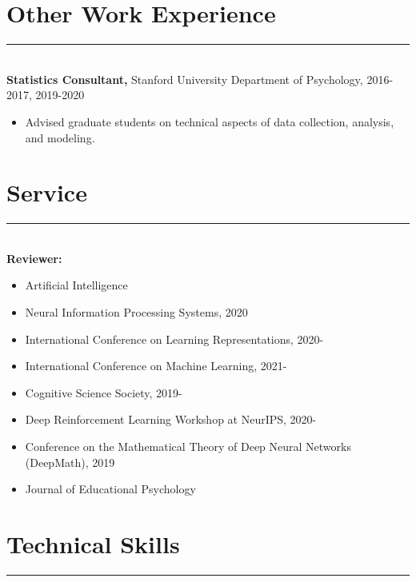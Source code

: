 \documentclass[margin]{res}
\begin{document}
\begin{resume}
\vspace{1pt}\section{Other Work Experience} \vspace{-15pt} \rule{\textwidth}{0.5pt} \\[3pt]
{\bf Statistics Consultant,} Stanford University Department of Psychology, 2016-2017, 2019-2020
\begin{itemize} \itemsep -2pt
 \item Advised graduate students on technical aspects of data collection, analysis, and modeling. \end{itemize}
\vspace{1pt}\section{Service} \vspace{-15pt} \rule{\textwidth}{0.5pt} \\[3pt]
{\bf Reviewer:} 
\begin{itemize} \itemsep -2pt
 \item Artificial Intelligence
 \item Neural Information Processing Systems, 2020
 \item International Conference on Learning Representations, 2020- 
 \item International Conference on Machine Learning, 2021-
 \item Cognitive Science Society, 2019-
 \item Deep Reinforcement Learning Workshop at NeurIPS, 2020-
 \item Conference on the Mathematical Theory of Deep Neural Networks (DeepMath), 2019
 \item Journal of Educational Psychology
 \end{itemize}
\vspace{1pt}\section{Technical Skills} \vspace{-15pt} \rule{\textwidth}{0.5pt} \\[3pt]

\end{resume}
\end{document}
